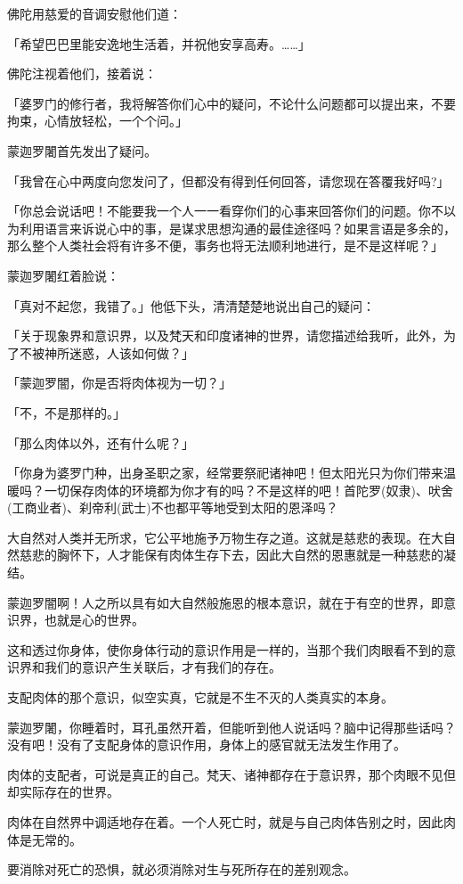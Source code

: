 \documentclass[twoside,openany]{book}
\begin{document}
佛陀用慈爱的音调安慰他们道：

「希望巴巴里能安逸地生活着，并祝他安享高寿。……」

佛陀注视着他们，接着说：

「婆罗门的修行者，我将解答你们心中的疑问，不论什么问题都可以提出来，不要拘束，心情放轻松，一个个问。」

蒙迦罗闍首先发出了疑问。

「我曾在心中两度向您发问了，但都没有得到任何回答，请您现在答覆我好吗?」

「你总会说话吧！不能要我一个人一一看穿你们的心事来回答你们的问题。你不以为利用语言来诉说心中的事，是谋求思想沟通的最佳途径吗？如果言语是多余的，那么整个人类社会将有许多不便，事务也将无法顺利地进行，是不是这样呢？」

蒙迦罗闍红着脸说：

「真对不起您，我错了。」他低下头，清清楚楚地说出自己的疑问：

「关于现象界和意识界，以及梵天和印度诸神的世界，请您描述给我听，此外，为了不被神所迷惑，人该如何做？」

「蒙迦罗闇，你是否将肉体视为一切？」

「不，不是那样的。」

「那么肉体以外，还有什么呢？」

「你身为婆罗门种，出身圣职之家，经常要祭祀诸神吧！但太阳光只为你们带来温暖吗？一切保存肉体的环境都为你才有的吗？不是这样的吧！首陀罗(奴隶)、吠舍(工商业者)、刹帝利(武士)不也都平等地受到太阳的恩泽吗？

大自然对人类并无所求，它公平地施予万物生存之道。这就是慈悲的表现。在大自然慈悲的胸怀下，人才能保有肉体生存下去，因此大自然的恩惠就是一种慈悲的凝结。

蒙迦罗闇啊！人之所以具有如大自然般施恩的根本意识，就在于有空的世界，即意识界，也就是心的世界。

这和透过你身体，使你身体行动的意识作用是一样的，当那个我们肉眼看不到的意识界和我们的意识产生关联后，才有我们的存在。

支配肉体的那个意识，似空实真，它就是不生不灭的人类真实的本身。

蒙迦罗闍，你睡着时，耳孔虽然开着，但能听到他人说话吗？脑中记得那些话吗？没有吧！没有了支配身体的意识作用，身体上的感官就无法发生作用了。

肉体的支配者，可说是真正的自己。梵天、诸神都存在于意识界，那个肉眼不见但却实际存在的世界。

肉体在自然界中调适地存在着。一个人死亡时，就是与自己肉体告别之时，因此肉体是无常的。

要消除对死亡的恐惧，就必须消除对生与死所存在的差别观念。
\end{document}
